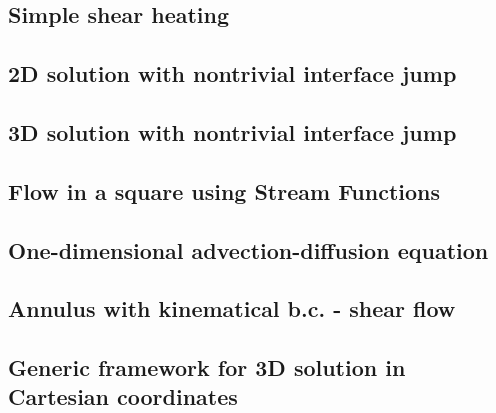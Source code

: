\subsection{Simple shear heating} \label{ss:shearheating} 


\subsection{2D solution with nontrivial interface jump} \label{ss:jump2D} 


\subsection{3D solution with nontrivial interface jump} \label{ss:jump3D} 


\subsection{Flow in a square using Stream Functions \label{ss:square_streamfct} }


\subsection{One-dimensional advection-diffusion equation \label{ss:advdiff} }


\subsection{Annulus with kinematical b.c. - shear flow}\label{ss:sfan}


\subsection{Generic framework for 3D solution in Cartesian coordinates}\label{ss:mms3Dgen}


